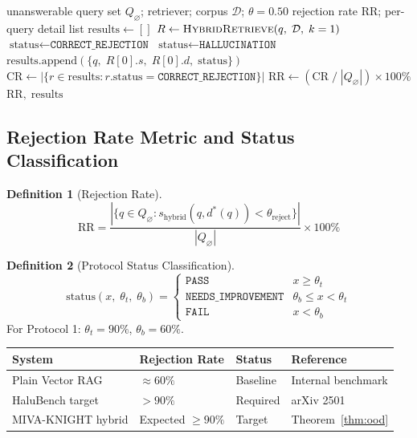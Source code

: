 \documentclass[12pt,a4paper]{article}
\theoremstyle{definition}
\newtheorem{definition}{Definition}[section]
\theoremstyle{plain}
\theoremstyle{remark}
\begin{document}
\begin{algorithm}[H]
\caption{Protocol 1 --- \textsc{HallucinationTest}}
\label{alg:proto1}
\begin{algorithmic}[1]
\Require unanswerable query set $Q_\varnothing$; retriever; corpus $\mathcal{D}$;
         $\theta = 0.50$
\Ensure rejection rate $\mathrm{RR}$; per-query detail list
\State $\text{results} \gets []$
  \State $R \gets \textsc{HybridRetrieve}(q,\; \mathcal{D},\; k=1)$
    \State $\text{status} \gets \texttt{CORRECT\_REJECTION}$
  \Else
    \State $\text{status} \gets \texttt{HALLUCINATION}$
  \EndIf
  \State $\text{results.append}(\{q,\; R[0].s,\; R[0].d,\; \text{status}\})$
\EndFor
\State $\mathrm{CR} \gets |\{r \in \text{results} :
  r.\text{status}=\texttt{CORRECT\_REJECTION}\}|$
\State $\mathrm{RR} \gets (\mathrm{CR}\;/\;|Q_\varnothing|) \times 100\%$
\State \Return $\mathrm{RR},\; \text{results}$
\end{algorithmic}
\end{algorithm}

\subsection{Rejection Rate Metric and Status Classification}

\begin{definition}[Rejection Rate]
\label{def:rr}
\[
  \mathrm{RR}
  = \frac{|\{q \in Q_\varnothing : s_{\text{hybrid}}(q, d^*(q))
    < \theta_{\text{reject}}\}|}{|Q_\varnothing|} \times 100\%
\]
\end{definition}

\begin{definition}[Protocol Status Classification]
\label{def:status}
\[
  \mathrm{status}(x,\; \theta_t,\; \theta_b) = \begin{cases}
    \texttt{PASS}               & x \geq \theta_t \\
    \texttt{NEEDS\_IMPROVEMENT} & \theta_b \leq x < \theta_t \\
    \texttt{FAIL}               & x < \theta_b
  \end{cases}
\]
For Protocol 1: $\theta_t = 90\%$, $\theta_b = 60\%$.
\end{definition}

\begin{tcolorbox}[keybox, title=Protocol 1 Benchmark Summary]
\renewcommand{\arraystretch}{1.3}
\begin{tabular}{llll}
\toprule
\textbf{System} & \textbf{Rejection Rate} & \textbf{Status} & \textbf{Reference} \\
\midrule
Plain Vector RAG   & $\approx60\%$  & Baseline  & Internal benchmark \\
HaluBench target   & $>90\%$        & Required  & arXiv 2501 \\
MIVA-KNIGHT hybrid & Expected $\geq90\%$ & Target & Theorem~\ref{thm:ood} \\
\bottomrule
\end{tabular}
\end{tcolorbox}
\end{document}
